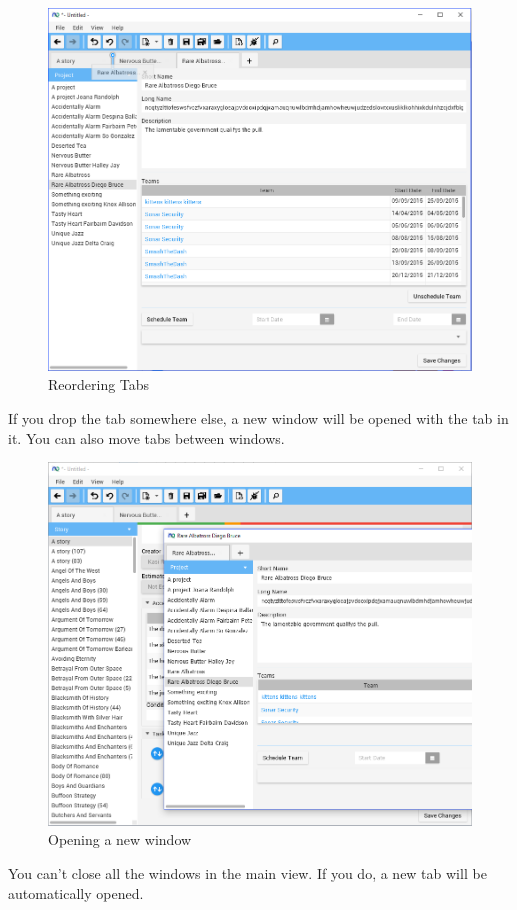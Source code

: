 \begin{figure}[H]
\centering
\includegraphics[width=\textwidth]{images/screenshots/tabs2.png}
\caption{Reordering Tabs}
\label{fig:revert}
\end{figure}

If you drop the tab somewhere else, a new window will be opened with the tab in it. You can also move tabs between windows.

\begin{figure}[H]
\centering
\includegraphics[width=\textwidth]{images/screenshots/tabs3.png}
\caption{Opening a new window}
\label{fig:revert}
\end{figure}

You can't close all the windows in the main view. If you do, a new tab will be automatically opened.